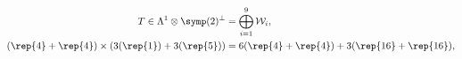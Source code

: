 \begin{equation}\label{sp2decomp}
\begin{aligned}
   T \in \Lambda^1 \otimes \symp(2)^\perp
      &= \bigoplus_{i=1}^{9} \mathcal{W}_i , \\
   (\rep{4}+\rep{4})\times(3(\rep{1})+ 3(\rep{5}))
      &= 6(\rep{4}+\rep{4})+3(\rep{16}+\rep{16}) ,
\end{aligned}
\end{equation}

